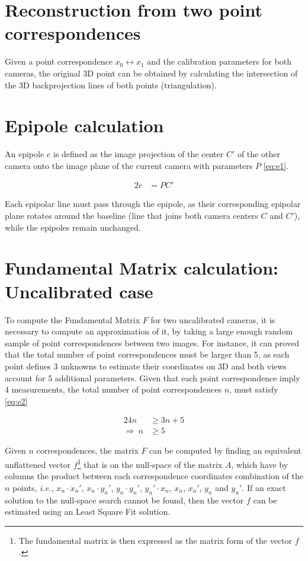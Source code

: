 \documentclass{article}
\begin{document}
\section{Reconstruction from two point correspondences}
Given a point correspondence $x_0 \leftrightarrow x_1$ and the calibration parameters for both cameras, the original 3D point can be obtained by calculating the intersection of the 3D backprojection lines of both points (triangulation).

\section{Epipole calculation}
An epipole $e$ is defined as the image projection of the center $C'$ of the other camera onto the image plane of the current camera with parameters $P$ \eqref{eq:e1}.

\begin{alignat}{2}
e &= PC' \label{eq:e1}
\end{alignat}   

Each epipolar line must pass through the epipole, as their corresponding epipolar plane rotates around the baseline (line that joins both camera centers $C$ and $C'$), while the epipoles remain unchanged.

\section{Fundamental Matrix calculation: Uncalibrated case}
To compute the Fundamental Matrix $F$ for two uncalibrated cameras, it is necessary to compute an approximation of it, by taking a large enough random sample of point correspondences between two images. For instance, it can proved that the total number of point correspondences must be larger than 5, as each point defines 3 unknowns to estimate their coordinates on 3D and both views account for 5 additional parameters. Given that each point correspondence imply 4 measurements, the total number of point correspondences $n$, must satisfy \eqref{eq:e2}

\begin{alignat}{2}
\nonumber
4n &\geq 3n + 5 \\
\Rightarrow ~ n &\geq 5 \label{eq:e2} 
\end{alignat}

Given $n$ correspondences, the matrix $F$ can be computed by finding an equivalent unflattened vector $f$\footnote{The fundamental matrix is then expressed as the matrix form of the vector $f$.} that is on the null-space of the matrix $A$, which have by columns the product between each correspondence coordinates combination of the $n$ points, \textit{i.e.,} $x_n \cdot x_n'$, $x_n \cdot y_n'$, $y_n \cdot y_n'$, $y_n' \cdot x_n$, $x_n$, $x_n'$, $y_n$ and $y_n'$. If an exact solution to the null-space search cannot be found, then the vector $f$ can be estimated using an Least Square Fit solution.
\end{document}
